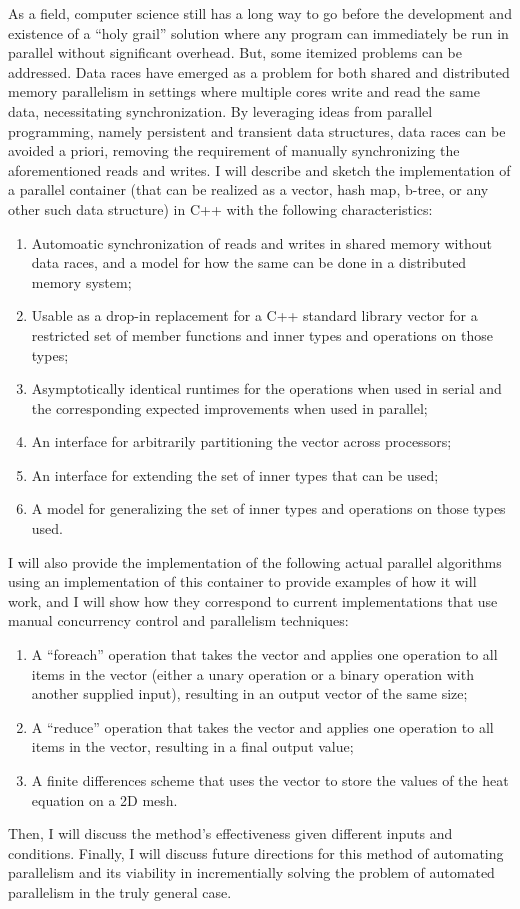 As a field, computer science still has a long way to go before the development
and existence of a ``holy grail'' solution where any program can immediately be
run in parallel without significant overhead. But, some itemized problems can be
addressed. Data races have emerged as a problem for both shared and distributed
memory parallelism in settings where multiple cores write and read the same
data, necessitating synchronization. By leveraging ideas from parallel
programming, namely persistent and transient data structures, data races can be
avoided a priori, removing the requirement of manually synchronizing the
aforementioned reads and writes. I will describe and sketch the implementation
of a parallel container (that can be realized as a vector, hash map, b-tree, or
any other such data structure) in C++ with the following characteristics:
\begin{enumerate}
    \item Automoatic synchronization of reads and writes in shared memory
        without data races, and a model for how the same can be done in a
        distributed memory system;
    \item Usable as a drop-in replacement for a C++ standard library vector for
        a restricted set of member functions and inner types and operations on
        those types;
    \item Asymptotically identical runtimes for the operations when used in
        serial and the corresponding expected improvements when used in
        parallel;
    \item An interface for arbitrarily partitioning the vector across
        processors;
    \item An interface for extending the set of inner types that can be used;
    \item A model for generalizing the set of inner types and operations on
        those types used.
\end{enumerate}

I will also provide the implementation of the following actual parallel
algorithms using an implementation of this container to provide examples
of how it will work, and I will show how they correspond to current
implementations that use manual concurrency control and parallelism techniques:
\begin{enumerate}
    \item A ``foreach'' operation that takes the vector and applies one
        operation to all items in the vector (either a unary operation or a
        binary operation with another supplied input), resulting in an output
        vector of the same size;
    \item A ``reduce'' operation that takes the vector and applies one operation
        to all items in the vector, resulting in a final output value;
    \item A finite differences scheme that uses the vector to store the values
        of the heat equation on a 2D mesh.
\end{enumerate}

Then, I will discuss the method's effectiveness given different inputs and
conditions. Finally, I will discuss future directions for this method of
automating parallelism and its viability in incrementially solving the problem
of automated parallelism in the truly general case.

